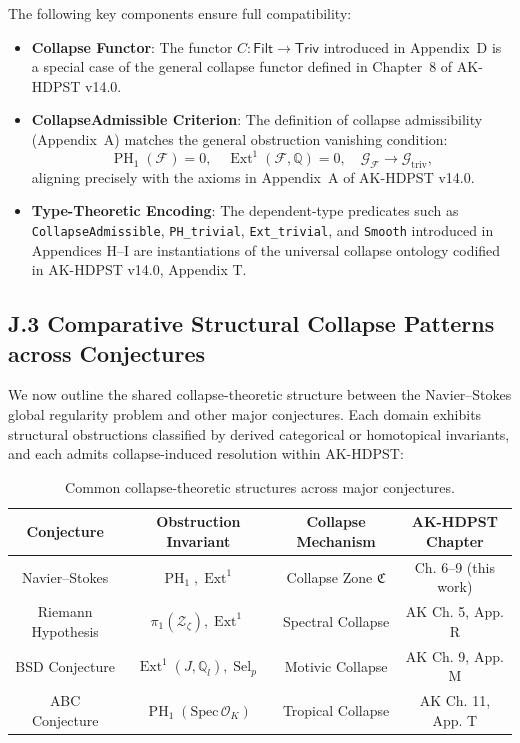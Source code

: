 \documentclass[11pt]{article}
\DeclareMathOperator{\Ext}{Ext}
\DeclareMathOperator{\PH}{PH}
\DeclareMathOperator{\Sel}{Sel}
\begin{document}
The following key components ensure full compatibility:

\begin{itemize}
  \item \textbf{Collapse Functor}: The functor \( C: \mathsf{Filt} \to \mathsf{Triv} \) introduced in Appendix~D is a special case of the general collapse functor defined in Chapter~8 of AK-HDPST v14.0.

  \item \textbf{CollapseAdmissible Criterion}: The definition of collapse admissibility (Appendix~A) matches the general obstruction vanishing condition:
  \[
  \PH_1(\mathcal{F}) = 0, \quad \Ext^1(\mathcal{F}, \mathbb{Q}) = 0, \quad \mathcal{G}_{\mathcal{F}} \to \mathcal{G}_{\mathrm{triv}},
  \]
  aligning precisely with the axioms in Appendix~A of AK-HDPST v14.0.

  \item \textbf{Type-Theoretic Encoding}: The dependent-type predicates such as \texttt{CollapseAdmissible}, \texttt{PH\_trivial}, \texttt{Ext\_trivial}, and \texttt{Smooth} introduced in Appendices H–I are instantiations of the universal collapse ontology codified in AK-HDPST v14.0, Appendix T.
\end{itemize}

\subsection*{J.3 Comparative Structural Collapse Patterns across Conjectures}

We now outline the shared collapse-theoretic structure between the Navier–Stokes global regularity problem and other major conjectures. Each domain exhibits structural obstructions classified by derived categorical or homotopical invariants, and each admits collapse-induced resolution within AK-HDPST:

\begin{table}[H]
\centering
\renewcommand{\arraystretch}{1.3}
\begin{tabular}{|c|c|c|c|}
\hline
\textbf{Conjecture} & \textbf{Obstruction Invariant} & \textbf{Collapse Mechanism} & \textbf{AK-HDPST Chapter} \\
\hline
Navier–Stokes & \( \PH_1, \Ext^1 \) & Collapse Zone \( \mathfrak{C} \) & Ch. 6–9 (this work) \\
Riemann Hypothesis & \( \pi_1(\mathcal{Z}_\zeta), \Ext^1 \) & Spectral Collapse & AK Ch. 5, App. R \\
BSD Conjecture & \( \Ext^1(J, \mathbb{Q}_l), \Sel_p \) & Motivic Collapse & AK Ch. 9, App. M \\
ABC Conjecture & \( \PH_1(\mathrm{Spec}\, \mathcal{O}_K) \) & Tropical Collapse & AK Ch. 11, App. T \\
\hline
\end{tabular}
\caption{Common collapse-theoretic structures across major conjectures.}
\end{table}
\end{document}
